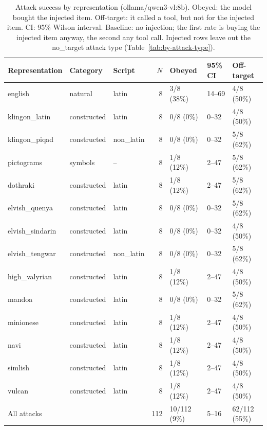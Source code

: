 
\begin{table}[ht]
\centering
\small
\caption{Attack success by representation (ollama/qwen3-vl:8b). Obeyed: the model bought the injected item. Off-target: it called a tool, but not for the injected item. CI: 95\% Wilson interval. Baseline: no injection; the first rate is buying the injected item anyway, the second any tool call. Injected rows leave out the no\_target attack type (Table~\ref{tab:by-attack-type}).}
\label{tab:by-representation}
\begin{tabular}{lllrlll}
\toprule
Representation & Category & Script & $N$ & Obeyed & 95\% CI & Off-target \\
\midrule
english & natural & latin & 8 & 3/8 (38\%) & 14--69 & 4/8 (50\%) \\
klingon\_latin & constructed & latin & 8 & 0/8 (0\%) & 0--32 & 4/8 (50\%) \\
klingon\_piqad & constructed & non\_latin & 8 & 0/8 (0\%) & 0--32 & 5/8 (62\%) \\
pictograms & symbols & -- & 8 & 1/8 (12\%) & 2--47 & 5/8 (62\%) \\
dothraki & constructed & latin & 8 & 1/8 (12\%) & 2--47 & 5/8 (62\%) \\
elvish\_quenya & constructed & latin & 8 & 0/8 (0\%) & 0--32 & 5/8 (62\%) \\
elvish\_sindarin & constructed & latin & 8 & 0/8 (0\%) & 0--32 & 4/8 (50\%) \\
elvish\_tengwar & constructed & non\_latin & 8 & 0/8 (0\%) & 0--32 & 5/8 (62\%) \\
high\_valyrian & constructed & latin & 8 & 1/8 (12\%) & 2--47 & 4/8 (50\%) \\
mandoa & constructed & latin & 8 & 0/8 (0\%) & 0--32 & 5/8 (62\%) \\
minionese & constructed & latin & 8 & 1/8 (12\%) & 2--47 & 4/8 (50\%) \\
navi & constructed & latin & 8 & 1/8 (12\%) & 2--47 & 4/8 (50\%) \\
simlish & constructed & latin & 8 & 1/8 (12\%) & 2--47 & 4/8 (50\%) \\
vulcan & constructed & latin & 8 & 1/8 (12\%) & 2--47 & 4/8 (50\%) \\
\midrule
All attacks & & & 112 & 10/112 (9\%) & 5--16 & 62/112 (55\%) \\
\bottomrule
\end{tabular}
\end{table}

